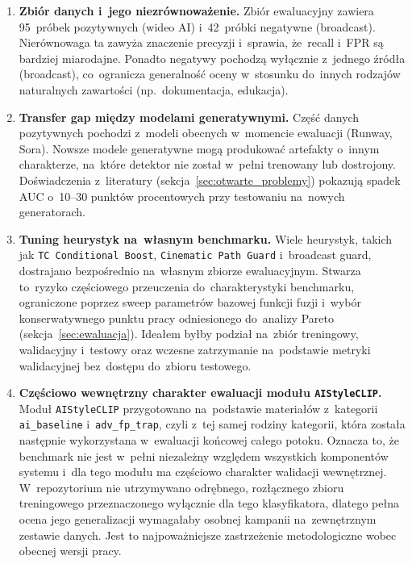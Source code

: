 \begin{enumerate}

  \item \textbf{Zbiór danych i~jego niezrównoważenie.}
    Zbiór ewaluacyjny zawiera 95~próbek pozytywnych (wideo AI) i~42~próbki negatywne (broadcast).
    Nierównowaga ta zawyża znaczenie precyzji i~sprawia, że~recall i~FPR są bardziej miarodajne.
    Ponadto negatywy pochodzą wyłącznie z~jednego źródła (broadcast), co~ogranicza generalność
    oceny w~stosunku do~innych rodzajów naturalnych zawartości (np.\ dokumentacja, edukacja).

  \item \textbf{Transfer gap między modelami generatywnymi.}
    Część danych pozytywnych pochodzi z~modeli obecnych w~momencie ewaluacji (Runway, Sora).
    Nowsze modele generatywne mogą produkować artefakty o~innym charakterze, na~które
    detektor nie został w~pełni trenowany lub dostrojony. Doświadczenia z~literatury
    (sekcja~\ref{sec:otwarte_problemy}) pokazują spadek AUC o~10--30 punktów procentowych
    przy testowaniu na~nowych generatorach.

  \item \textbf{Tuning heurystyk na~własnym benchmarku.}
    Wiele heurystyk, takich jak \texttt{TC Conditional Boost}, \texttt{Cinematic Path Guard}
    i~broadcast guard, dostrajano bezpośrednio na~własnym zbiorze ewaluacyjnym.
    Stwarza to~ryzyko częściowego przeuczenia do~charakterystyki benchmarku,
    ograniczone poprzez sweep parametrów bazowej funkcji fuzji i~wybór
    konserwatywnego punktu pracy odniesionego do~analizy Pareto
    (sekcja~\ref{sec:ewaluacja}).
    Ideałem byłby podział na~zbiór treningowy, walidacyjny i~testowy oraz
    wczesne zatrzymanie na~podstawie metryki walidacyjnej bez~dostępu do~zbioru testowego.

  \item \textbf{Częściowo wewnętrzny charakter ewaluacji modułu \texttt{AIStyleCLIP}.}
    Moduł \texttt{AIStyleCLIP} przygotowano na~podstawie materiałów z~kategorii
    \texttt{ai\_baseline} i~\texttt{adv\_fp\_trap}, czyli z~tej samej rodziny kategorii,
    która została następnie wykorzystana w~ewaluacji końcowej całego potoku.
    Oznacza to, że benchmark nie jest w~pełni niezależny względem wszystkich
    komponentów systemu i~dla tego modułu ma częściowo charakter walidacji wewnętrznej.
    W~repozytorium nie utrzymywano odrębnego, rozłącznego zbioru treningowego
    przeznaczonego wyłącznie dla tego klasyfikatora, dlatego pełna ocena jego
    generalizacji wymagałaby osobnej kampanii na~zewnętrznym zestawie danych.
    Jest to najpoważniejsze zastrzeżenie metodologiczne wobec obecnej wersji pracy.


\end{enumerate}
